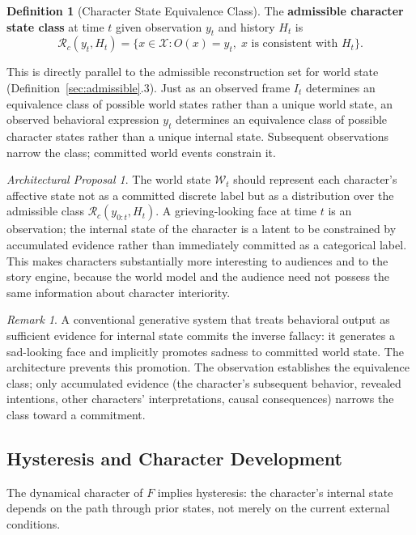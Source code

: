 \documentclass[11pt,a4paper]{article}
\theoremstyle{plain}
\theoremstyle{definition}
\newtheorem{definition}[theorem]{Definition}
\theoremstyle{remark}
\newtheorem{remark}[theorem]{Remark}
\newtheorem{proposal}[theorem]{Architectural Proposal}
\begin{document}
\begin{definition}[Character State Equivalence Class]
The \textbf{admissible character state class} at time $t$ given observation $y_t$ and history $H_t$ is
\[
\mathcal{R}_c(y_t, H_t) = \{x \in \mathcal{X} : O(x) = y_t,\; x \text{ is consistent with } H_t\}.
\]
\end{definition}

This is directly parallel to the admissible reconstruction set for world state (Definition~\ref{sec:admissible}.3). Just as an observed frame $I_t$ determines an equivalence class of possible world states rather than a unique world state, an observed behavioral expression $y_t$ determines an equivalence class of possible character states rather than a unique internal state. Subsequent observations narrow the class; committed world events constrain it.

\begin{proposal}
The world state $\mathcal{W}_t$ should represent each character's affective state not as a committed discrete label but as a distribution over the admissible class $\mathcal{R}_c(y_{0:t}, H_t)$. A grieving-looking face at time $t$ is an observation; the internal state of the character is a latent to be constrained by accumulated evidence rather than immediately committed as a categorical label. This makes characters substantially more interesting to audiences and to the story engine, because the world model and the audience need not possess the same information about character interiority.
\end{proposal}

\begin{remark}
A conventional generative system that treats behavioral output as sufficient evidence for internal state commits the inverse fallacy: it generates a sad-looking face and implicitly promotes sadness to committed world state. The architecture prevents this promotion. The observation establishes the equivalence class; only accumulated evidence (the character's subsequent behavior, revealed intentions, other characters' interpretations, causal consequences) narrows the class toward a commitment.
\end{remark}

\subsection{Hysteresis and Character Development}

The dynamical character of $F$ implies hysteresis: the character's internal state depends on the path through prior states, not merely on the current external conditions.
\end{document}

